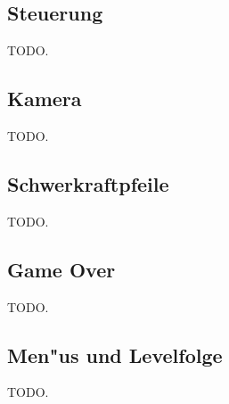 \subsection{Steuerung}
\label{sec:implementation/controls}
%
TODO.
%
\subsection{Kamera}
\label{sec:implementation/camera}
%
TODO.
%
\subsection{Schwerkraftpfeile}
\label{sec:implementation/arrows}
%
TODO.
%
\subsection{Game Over}
\label{sec:implementation/gameover}
%
TODO.
%
\subsection{Men"us und Levelfolge}
\label{sec:implementation/menus}
%
TODO.
